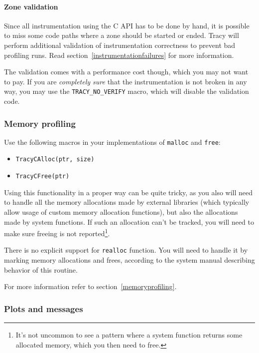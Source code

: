 \documentclass[hidelinks,titlepage,a4paper]{article}
\begin{document}
\paragraph{Zone validation}

Since all instrumentation using the C API has to be done by hand, it is possible to miss some code paths where a zone should be started or ended. Tracy will perform additional validation of instrumentation correctness to prevent bad profiling runs. Read section~\ref{instrumentationfailures} for more information.

The validation comes with a performance cost though, which you may not want to pay. If you are \emph{completely sure} that the instrumentation is not broken in any way, you may use the \texttt{TRACY\_NO\_VERIFY} macro, which will disable the validation code.

\subsubsection{Memory profiling}

Use the following macros in your implementations of \texttt{malloc} and \texttt{free}:

\begin{itemize}
\item \texttt{TracyCAlloc(ptr, size)}
\item \texttt{TracyCFree(ptr)}
\end{itemize}

Using this functionality in a proper way can be quite tricky, as you also will need to handle all the memory allocations made by external libraries (which typically allow usage of custom memory allocation functions), but also the allocations made by system functions. If such an allocation can't be tracked, you will need to make sure freeing is not reported\footnote{It's not uncommon to see a pattern where a system function returns some allocated memory, which you then need to free.}.

There is no explicit support for \texttt{realloc} function. You will need to handle it by marking memory allocations and frees, according to the system manual describing behavior of this routine.

For more information refer to section~\ref{memoryprofiling}.

\subsubsection{Plots and messages}
\end{document}
